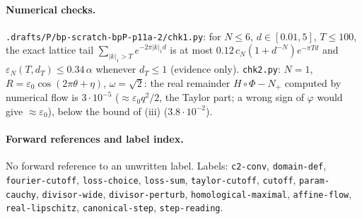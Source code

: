 \paragraph{Numerical checks.} \texttt{.drafts/P/bp-scratch-bpP-p11a-2/chk1.py}: for $N\le6$, $d\in[0.01,5]$, $T\le100$, the exact lattice tail $\sum_{\lvert k\rvert_1>T}e^{-2\pi\lvert k\rvert_1d}$ is at most $0.12\,c_N(1+d^{-N})e^{-\pi Td}$ and $\varepsilon_N(T,d_T)\le0.34\,\alpha$ whenever $d_T\le1$ (evidence only). \texttt{chk2.py}: $N=1$, $R=\varepsilon_0\cos(2\pi\theta+\eta)$, $\omega=\sqrt2$: the real remainder $H\circ\Phi-N_+$ computed by numerical flow is $3\cdot10^{-5}$ ($\approx\varepsilon_0q^2/2$, the Taylor part; a wrong sign of $\varphi$ would give $\approx\varepsilon_0$), below the bound of (iii) ($3.8\cdot10^{-2}$).

\paragraph{Forward references and label index.} No forward reference to an unwritten label. Labels: \texttt{c2-conv}, \texttt{domain-def}, \texttt{fourier-cutoff}, \texttt{loss-choice}, \texttt{loss-sum}, \texttt{taylor-cutoff}, \texttt{cutoff}, \texttt{param-cauchy}, \texttt{divisor-wide}, \texttt{divisor-perturb}, \texttt{homological-maximal}, \texttt{affine-flow}, \texttt{real-lipschitz}, \texttt{canonical-step}, \texttt{step-reading}.
\par\endgroup
